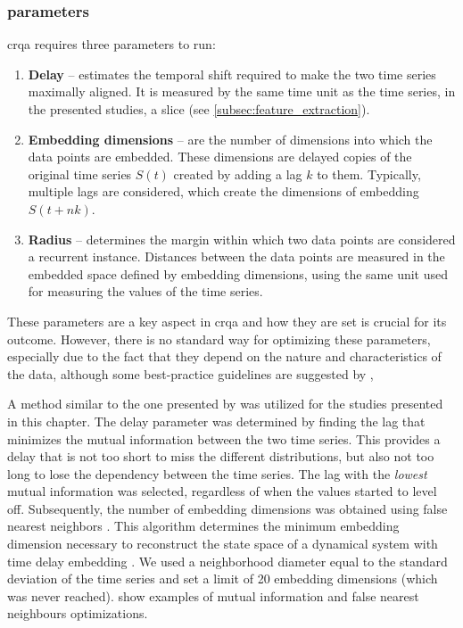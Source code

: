 \subsubsection{parameters}
\label{subsubsec:parameters_crqa}

\Ac{crqa} requires three parameters to run:

\begin{enumerate}
	\item \textbf{Delay} -- estimates the temporal shift required to make the two time series maximally aligned.
	It is measured by the same time unit as the time series, in the presented studies, a slice (see \cref{subsec:feature_extraction}).
	
	\item \textbf{Embedding dimensions} -- are the number of dimensions into which the data points are embedded.
	These dimensions are delayed copies of the original time series $S(t)$ created by adding a lag $k$ to them.
	Typically, multiple lags are considered, which create the dimensions of embedding $S(t + nk)$.
	
	\item \textbf{Radius} -- determines the margin within which two data points are considered a recurrent instance.
	Distances between the data points are measured in the embedded space defined by embedding dimensions, using the same unit used for measuring the values of the time series.
\end{enumerate}
%
These parameters are a key aspect in \ac{crqa} and how they are set is crucial for its outcome.
However, there is no standard way for optimizing these parameters, especially due to the fact that they depend on the nature and characteristics of the data, although some best-practice guidelines are suggested by \citet{Coco2014crqa-r},

A method similar to the one presented by \citet{Marwan2007recurrence} was utilized for the studies presented in this chapter.
The delay parameter was determined by finding the lag that minimizes the mutual information between the two time series.
This provides a delay that is not too short to miss the different distributions, but also not too long to lose the dependency between the time series.
The lag with the \emph{lowest} mutual information was selected, regardless of when the values started to level off.
Subsequently, the number of embedding dimensions was obtained using false nearest neighbors \citep{Kennel1992determining}.
This algorithm determines the minimum embedding dimension necessary to reconstruct the state space of a dynamical system with time delay embedding \citep{Abarbanel1993local}.
We used a neighborhood diameter equal to the standard deviation of the time series and set a limit of 20 embedding dimensions (which was never reached).
 show examples of mutual information and false nearest neighbours optimizations.

